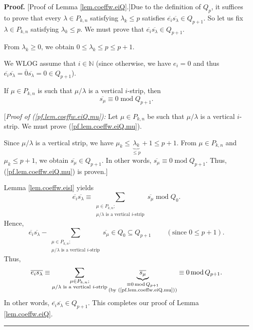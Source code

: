 \documentclass[numbers=enddot,12pt,final,onecolumn,notitlepage]{scrartcl}%
\theoremstyle{definition}
\newenvironment{proof}[1][Proof]{\noindent\textbf{#1.} }{\ \rule{0.5em}{0.5em}}
\let\sumnonlimits\sum
\renewcommand{\sum}{\sumnonlimits\limits}
\begin{document}
\begin{proof}
[Proof of Lemma \ref{lem.coeffw.eiQ}.]Due to the definition of $Q_{p}$, it
suffices to prove that every $\lambda\in P_{k,n}$ satisfying $\lambda_{k}\leq
p$ satisfies $\overline{e_{i}}\overline{s_{\lambda}}\in Q_{p+1}$. So let us
fix $\lambda\in P_{k,n}$ satisfying $\lambda_{k}\leq p$. We must prove that
$\overline{e_{i}}\overline{s_{\lambda}}\in Q_{p+1}$.

From $\lambda_{k}\geq0$, we obtain $0\leq\lambda_{k}\leq p\leq p+1$.

We WLOG assume that $i\in\mathbb{N}$ (since otherwise, we have $e_{i}=0$ and
thus $\overline{e_{i}}\overline{s_{\lambda}}=\overline{0}\overline{s_{\lambda
}}=0\in Q_{p+1}$).

If $\mu\in P_{k,n}$ is such that $\mu/\lambda$ is a vertical $i$-strip, then%
\begin{equation}
\overline{s_{\mu}}\equiv0\operatorname{mod}Q_{p+1}.
\label{pf.lem.coeffw.eiQ.mu}%
\end{equation}


[\textit{Proof of (\ref{pf.lem.coeffw.eiQ.mu}):} Let $\mu\in P_{k,n}$ be such
that $\mu/\lambda$ is a vertical $i$-strip. We must prove
(\ref{pf.lem.coeffw.eiQ.mu}).

Since $\mu/\lambda$ is a vertical strip, we have $\mu_{k}\leq
\underbrace{\lambda_{k}}_{\leq p}+1\leq p+1$. From $\mu\in P_{k,n}$ and
$\mu_{k}\leq p+1$, we obtain $\overline{s_{\mu}}\in Q_{p+1}$. In other words,
$\overline{s_{\mu}}\equiv0\operatorname{mod}Q_{p+1}$. Thus,
(\ref{pf.lem.coeffw.eiQ.mu}) is proven.]

Lemma \ref{lem.coeffw.eisl} yields%
\[
\overline{e_{i}}\overline{s_{\lambda}}\equiv\sum_{\substack{\mu\in
P_{k,n};\\\mu/\lambda\text{ is a vertical }i\text{-strip}}}\overline{s_{\mu}%
}\operatorname{mod}Q_{0}.
\]
Hence,%
\[
\overline{e_{i}}\overline{s_{\lambda}}-\sum_{\substack{\mu\in P_{k,n}%
;\\\mu/\lambda\text{ is a vertical }i\text{-strip}}}\overline{s_{\mu}}\in
Q_{0}\subseteq Q_{p+1}\ \ \ \ \ \ \ \ \ \ \left(  \text{since }0\leq
p+1\right)  .
\]
Thus,%
\begin{equation}
\overline{e_{i}}\overline{s_{\lambda}}\equiv\sum_{\substack{\mu\in
P_{k,n};\\\mu/\lambda\text{ is a vertical }i\text{-strip}}%
}\underbrace{\overline{s_{\mu}}}_{\substack{\equiv0\operatorname{mod}%
Q_{p+1}\\\text{(by (\ref{pf.lem.coeffw.eiQ.mu}))}}}\equiv0\operatorname{mod}%
Q_{p+1}.\nonumber
\end{equation}
In other words, $\overline{e_{i}}\overline{s_{\lambda}}\in Q_{p+1}$. This
completes our proof of Lemma \ref{lem.coeffw.eiQ}.
\end{proof}
\end{document}
